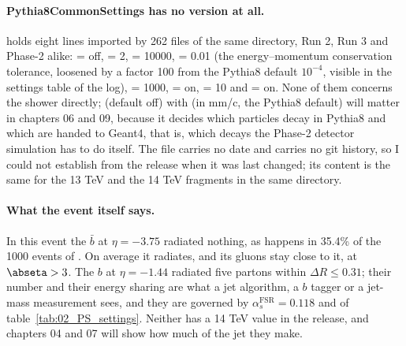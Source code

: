 \paragraph{Pythia8CommonSettings has no version at all.}
 holds eight lines imported by 262 files of
the same directory, Run 2, Run 3 and Phase-2 alike:  = off,
 = 2,  = 10000,  = 0.01 (the energy--momentum
conservation tolerance, loosened by a factor 100 from the Pythia8 default $10^{-4}$, visible in the settings table
of the log),  = 1000,  = on,  = 10 and
 = on. None of them concerns the shower directly;  (default
off) with  (in mm/c, the Pythia8 default) will matter in chapters 06 and 09, because it decides
which particles decay in Pythia8 and which are handed to Geant4, that is, which decays the Phase-2 detector
simulation has to do itself. The file carries no date and  carries no git history, so I could not
establish from the release when it was last changed; its content is the same for the 13 TeV and the 14 TeV
fragments in the same directory.

\paragraph{What the event itself says.} In this event the $\bar b$ at $\eta = -3.75$ radiated nothing, as happens
in 35.4\% of the 1000 events of . On average it radiates, and its gluons stay close
to it, at $\abseta > 3$. The $b$ at $\eta = -1.44$ radiated five partons within $\Delta R \le 0.31$; their number
and their energy sharing are what a jet algorithm, a $b$ tagger or a jet-mass measurement sees, and they are
governed by $\alpha_s^\mathrm{FSR} = 0.118$ and  of table~\ref{tab:02_PS_settings}.
Neither has a 14 TeV value in the release, and chapters 04 and 07 will show how much of the jet they make.
